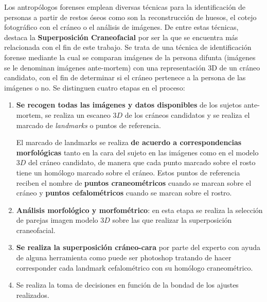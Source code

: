 \noindent Los antropólogos forenses emplean diversas técnicas para la identificación de personas a partir de restos óseos como son la reconstrucción de huesos, el cotejo fotográfico con el cráneo o el análisis de imágenes. De entre estas técnicas, destaca la \textbf{Superposición Craneofacial} por ser la que se encuentra más relacionada con el fin de este trabajo. Se trata de una técnica de identificación forense mediante la cual se comparan imágenes de la persona difunta (imágenes se le denominan imágenes ante-mortem) con una representación 3D de un cráneo candidato, con el fin de determinar si el cráneo pertenece a la persona de las imágenes o no. Se distinguen cuatro etapas en el proceso: 

\begin{enumerate}
    \item \textbf{Se recogen todas las imágenes y datos disponibles} de los sujetos ante-mortem, se realiza un escaneo $3D$ de los cráneos candidatos y se realiza el marcado de \textit{landmarks} o puntos de referencia. 
    
    \medskip
    
    \noindent El marcado de landmarks se realiza \textbf{de acuerdo a correspondencias morfológicas} tanto en la cara del sujeto en las imágenes como en el modelo $3D$ del cráneo candidato, de manera que cada punto marcado sobre el rosto tiene un homólogo marcado sobre el cráneo. Estos puntos de referencia reciben el nombre de \textbf{puntos craneométricos} cuando se marcan sobre el cráneo y \textbf{puntos cefalométricos} cuando se marcan sobre el rostro.
    \item \textbf{Análisis morfológico y morfométrico}: en esta etapa se realiza la selección de parejas imagen modelo $3D$ sobre las que realizar la superposición craneofacial.
    \item \textbf{Se realiza la superposición cráneo-cara} por parte del experto con ayuda de alguna herramienta como puede ser photoshop tratando de hacer corresponder cada landmark cefalométrico con su homólogo craneométrico.
    \item Se realiza la toma de decisiones en función de la bondad de los ajustes realizados.
\end{enumerate}

